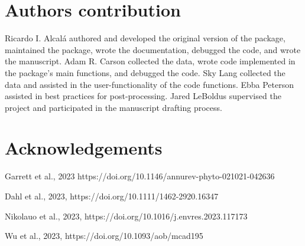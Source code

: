 \documentclass[11pt, oneside]{article}   	%
\begin{document}
 
\section*{Authors contribution}
Ricardo I. Alcal\'a authored and developed the original version of the package, maintained the package, wrote the documentation, debugged the code, and wrote the manuscript. Adam R. Carson collected the data, wrote code implemented in the package’s main functions, and debugged the code. Sky Lang collected the data and assisted in the user-functionality of the code functions. Ebba Peterson assisted in best practices for post-processing. Jared LeBoldus supervised the project and participated in the manuscript drafting process.
\section*{Acknowledgements}

Garrett et al., 2023 https://doi.org/10.1146/annurev-phyto-021021-042636

Dahl et al., 2023,  https://doi.org/10.1111/1462-2920.16347

Nikolauo et al., 2023, https://doi.org/10.1016/j.envres.2023.117173

Wu et al., 2023, https://doi.org/10.1093/aob/mcad195
\end{document}
